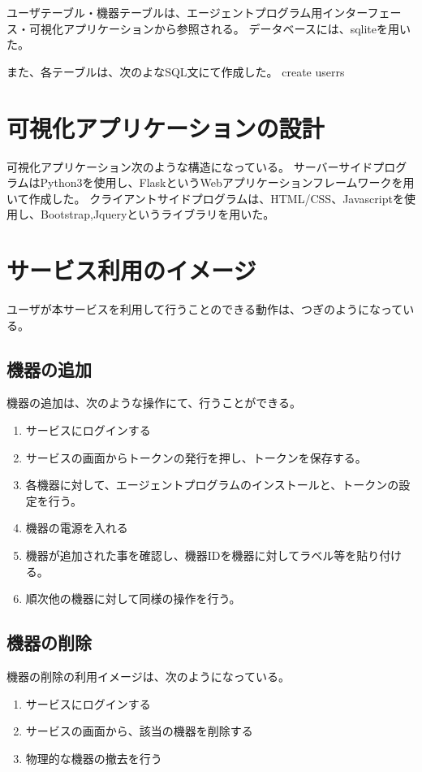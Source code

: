 ユーザテーブル・機器テーブルは、エージェントプログラム用インターフェース・可視化アプリケーションから参照される。
データベースには、sqliteを用いた。

また、各テーブルは、次のよなSQL文にて作成した。
create userrs


\section{可視化アプリケーションの設計}
可視化アプリケーション次のような構造になっている。
サーバーサイドプログラムはPython3を使用し、FlaskというWebアプリケーションフレームワークを用いて作成した。
クライアントサイドプログラムは、HTML/CSS、Javascriptを使用し、Bootstrap,Jqueryというライブラリを用いた。


\section{サービス利用のイメージ}
ユーザが本サービスを利用して行うことのできる動作は、つぎのようになっている。
\subsection{機器の追加}
機器の追加は、次のような操作にて、行うことができる。
\begin{enumerate}
\item サービスにログインする
\item サービスの画面からトークンの発行を押し、トークンを保存する。
\item 各機器に対して、エージェントプログラムのインストールと、トークンの設定を行う。
\item 機器の電源を入れる
\item 機器が追加された事を確認し、機器IDを機器に対してラベル等を貼り付ける。
\item 順次他の機器に対して同様の操作を行う。
\end{enumerate}

\subsection{機器の削除}
機器の削除の利用イメージは、次のようになっている。
\begin{enumerate}
\item サービスにログインする
\item サービスの画面から、該当の機器を削除する
\item 物理的な機器の撤去を行う
\end{enumerate}



